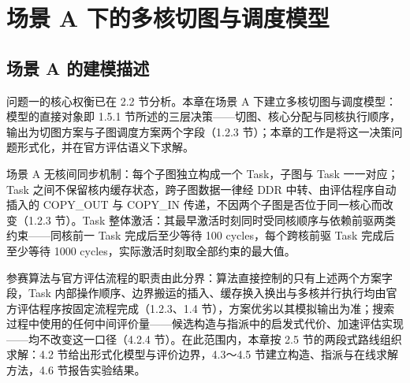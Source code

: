 \section{场景 A 下的多核切图与调度模型}\label{sec:q1}

\subsection{场景 A 的建模描述}\label{sec:q1-desc}
问题一的核心权衡已在 2.2 节分析。本章在场景 A 下建立多核切图与调度模型：模型的直接对象即 1.5.1 节所述的三层决策——切图、核心分配与同核执行顺序，输出为切图方案与子图调度方案两个字段（1.2.3 节）；本章的工作是将这一决策问题形式化，并在官方评估语义下求解。

场景 A 无核间同步机制：每个子图独立构成一个 Task，子图与 Task 一一对应；Task 之间不保留核内缓存状态，跨子图数据一律经 DDR 中转、由评估程序自动插入的 COPY\_OUT 与 COPY\_IN 传递，不因两个子图是否位于同一核心而改变（1.2.3 节）。Task 整体激活：其最早激活时刻同时受同核顺序与依赖前驱两类约束——同核前一 Task 完成后至少等待 100 cycles，每个跨核前驱 Task 完成后至少等待 1000 cycles，实际激活时刻取全部约束的最大值。

参赛算法与官方评估流程的职责由此分界：算法直接控制的只有上述两个方案字段，Task 内部操作顺序、边界搬运的插入、缓存换入换出与多核并行执行均由官方评估程序按固定流程完成（1.2.3、1.4 节），方案优劣以其模拟输出为准；搜索过程中使用的任何中间评价量——候选构造与指派中的启发式代价、加速评估实现——均不改变这一口径（4.2.4 节）。在此范围内，本章按 2.5 节的两段式路线组织求解：4.2 节给出形式化模型与评价边界，4.3～4.5 节建立构造、指派与在线求解方法，4.6 节报告实验结果。

